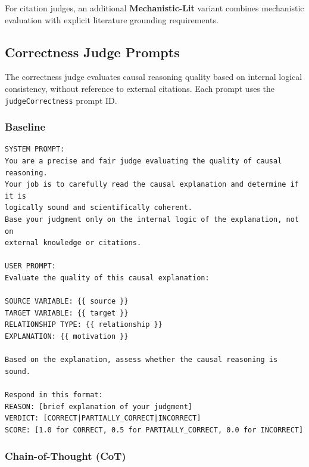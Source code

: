 For citation judges, an additional \textbf{Mechanistic-Lit} variant combines mechanistic evaluation with explicit literature grounding requirements.

\subsection{Correctness Judge Prompts}
\label{sec:correctness_prompts}

The correctness judge evaluates causal reasoning quality based on internal logical consistency, without reference to external citations. Each prompt uses the \texttt{judgeCorrectness} prompt ID.

\subsubsection{Baseline}

\begin{lstlisting}[caption={Correctness Judge: Baseline Prompt},label={lst:correctness_baseline}]
SYSTEM PROMPT:
You are a precise and fair judge evaluating the quality of causal reasoning.
Your job is to carefully read the causal explanation and determine if it is 
logically sound and scientifically coherent.
Base your judgment only on the internal logic of the explanation, not on 
external knowledge or citations.

USER PROMPT:
Evaluate the quality of this causal explanation:

SOURCE VARIABLE: {{ source }}
TARGET VARIABLE: {{ target }}
RELATIONSHIP TYPE: {{ relationship }}
EXPLANATION: {{ motivation }}

Based on the explanation, assess whether the causal reasoning is sound.

Respond in this format:
REASON: [brief explanation of your judgment]
VERDICT: [CORRECT|PARTIALLY_CORRECT|INCORRECT]
SCORE: [1.0 for CORRECT, 0.5 for PARTIALLY_CORRECT, 0.0 for INCORRECT]
\end{lstlisting}

\subsubsection{Chain-of-Thought (CoT)}

